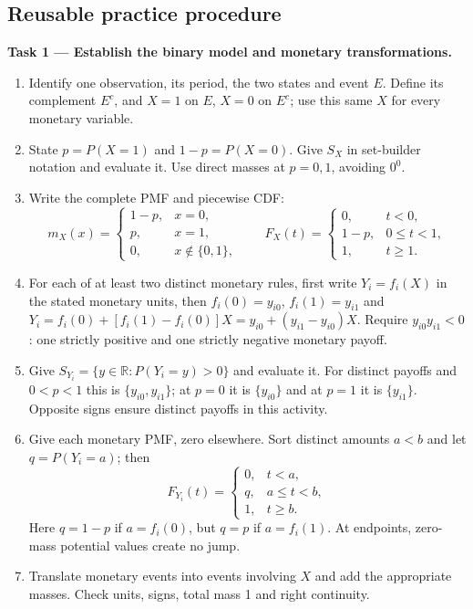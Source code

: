 \subsection{Reusable practice procedure}
\textbf{Task 1 --- Establish the binary model and monetary transformations.}
\begin{enumerate}
\item Identify one observation, its period, the two states and event $E$.
Define its complement $E^c$, and $X=1$ on $E$, $X=0$ on $E^c$; use this same $X$ for every monetary variable.
\item State $p=P(X=1)$ and $1-p=P(X=0)$. Give $S_X$ in set-builder notation
and evaluate it. Use direct masses at $p=0,1$, avoiding $0^0$.
\item Write the complete PMF and piecewise CDF:
\[
m_X(x)=\begin{cases}1-p,&x=0,\\p,&x=1,\\0,&x\notin\{0,1\},\end{cases}
\qquad
F_X(t)=\begin{cases}0,&t<0,\\1-p,&0\leq t<1,\\1,&t\geq1.\end{cases}
\]
\item For each of at least two distinct monetary rules, first write $Y_i=f_i(X)$ in the stated monetary units,
then $f_i(0)=y_{i0}$, $f_i(1)=y_{i1}$ and
$Y_i=f_i(0)+[f_i(1)-f_i(0)]X=y_{i0}+(y_{i1}-y_{i0})X$. Require $y_{i0}y_{i1}<0$: one strictly positive and one strictly negative monetary payoff.
\item Give $S_{Y_i}=\{y\in\mathbb R:P(Y_i=y)>0\}$ and evaluate it.
For distinct payoffs and $0<p<1$ this is $\{y_{i0},y_{i1}\}$;
at $p=0$ it is $\{y_{i0}\}$ and at $p=1$ it is $\{y_{i1}\}$.
Opposite signs ensure distinct payoffs in this activity.
\item Give each monetary PMF, zero elsewhere. Sort distinct amounts
$a<b$ and let $q=P(Y_i=a)$; then
\[
F_{Y_i}(t)=\begin{cases}0,&t<a,\\q,&a\leq t<b,\\1,&t\geq b.\end{cases}
\]
Here $q=1-p$ if $a=f_i(0)$, but $q=p$ if $a=f_i(1)$.
At endpoints, zero-mass potential values create no jump.
\item Translate monetary events into events involving $X$ and add the
appropriate masses. Check units, signs, total mass 1 and right continuity.
\end{enumerate}
